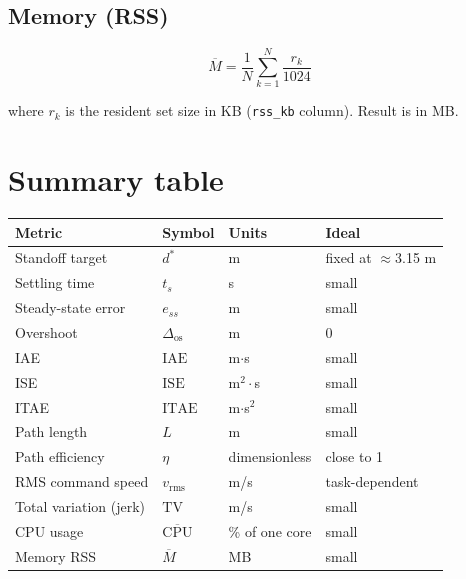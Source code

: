 \documentclass[11pt,a4paper]{article}
\begin{document}
\subsection{Memory (RSS)}

\[
  \overline{M} = \frac{1}{N} \sum_{k=1}^{N} \frac{r_k}{1024}
\]

where $r_k$ is the resident set size in KB (\texttt{rss\_kb} column).
Result is in MB.

\section{Summary table}

\begin{center}
  \begin{tabular}{llll}
    \toprule
    Metric & Symbol & Units & Ideal \\
    \midrule
    Standoff target         & $d^*$                   & m                & fixed at $\approx$3.15 m \\
    Settling time           & $t_s$                   & s                & small \\
    Steady-state error      & $e_{ss}$                & m                & small \\
    Overshoot               & $\Delta_\mathrm{os}$    & m                & 0 \\
    IAE                     & $\mathrm{IAE}$          & m$\cdot$s        & small \\
    ISE                     & $\mathrm{ISE}$          & m$^2\cdot$s      & small \\
    ITAE                    & $\mathrm{ITAE}$         & m$\cdot$s$^2$    & small \\
    Path length             & $L$                     & m                & small \\
    Path efficiency         & $\eta$                  & dimensionless    & close to 1 \\
    RMS command speed       & $v_\mathrm{rms}$        & m/s              & task-dependent \\
    Total variation (jerk)  & $\mathrm{TV}$           & m/s              & small \\
    CPU usage               & $\overline{\mathrm{CPU}}$ & \% of one core & small \\
    Memory RSS              & $\overline{M}$          & MB               & small \\
    \bottomrule
  \end{tabular}
\end{center}
\end{document}
